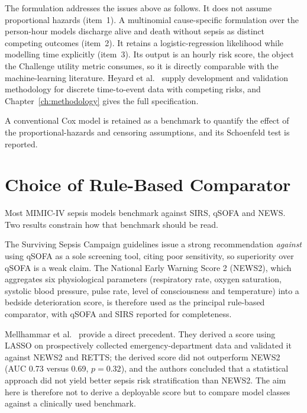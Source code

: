 The formulation addresses the issues above as follows. It does not assume
proportional hazards (item~1). A multinomial cause-specific formulation over
the person-hour models discharge alive and death without sepsis as distinct
competing outcomes \cite{rescherigon2006competing, heyard2019dynamic}
(item~2). It retains a logistic-regression likelihood while modelling time
explicitly (item~3). Its output is an hourly risk score, the object the
Challenge utility metric consumes, so it is directly comparable with the
machine-learning literature. Heyard et al.\ \cite{heyard2019dynamic,
heyard2020evaluation} supply development and validation methodology for
discrete time-to-event data with competing risks, and
Chapter~\ref{ch:methodology} gives the full specification.

A conventional Cox model is retained as a benchmark to quantify the effect of
the proportional-hazards and censoring assumptions, and its Schoenfeld test is
reported.


\section{Choice of Rule-Based Comparator}
\label{sec:comparator_choice}

Most MIMIC-IV sepsis models benchmark against SIRS, qSOFA and NEWS. Two results
constrain how that benchmark should be read.

The Surviving Sepsis Campaign guidelines \cite{evans2021ssc} issue a strong
recommendation \emph{against} using qSOFA as a sole screening tool, citing poor
sensitivity, so superiority over qSOFA is a weak claim. The National Early
Warning Score 2 (NEWS2), which aggregates six physiological parameters
(respiratory rate, oxygen saturation, systolic blood pressure, pulse rate,
level of consciousness and temperature) into a bedside deterioration score, is
therefore used as the principal rule-based comparator, with qSOFA and SIRS
reported for completeness.

Mellhammar et al.\ \cite{mellhammar2020news2} provide a direct precedent. They
derived a score using LASSO on prospectively collected emergency-department
data and validated it against NEWS2 and RETTS; the derived score did not
outperform NEWS2 (AUC 0.73 versus 0.69, $p = 0.32$), and the authors concluded
that a statistical approach did not yield better sepsis risk stratification
than NEWS2. The aim here is therefore not to derive a deployable score but to
compare model classes against a clinically used benchmark.


